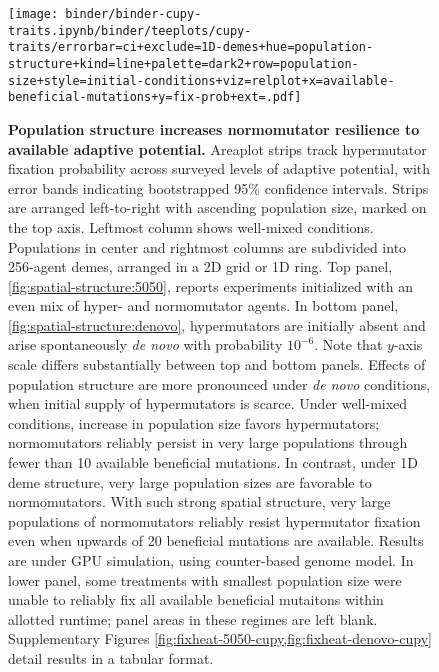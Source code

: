 \begin{figure}[h]
\begin{minipage}{\textwidth}
  \texttt{[image: binder/binder-cupy-traits.ipynb/binder/teeplots/cupy-traits/errorbar=ci+exclude=1D-demes+hue=population-structure+kind=line+palette=dark2+row=population-size+style=initial-conditions+viz=relplot+x=available-beneficial-mutations+y=fix-prob+ext=.pdf]}%
\end{minipage}

\begin{minipage}{\textwidth}
  \caption{%
    \textbf{Population structure increases normomutator resilience to available adaptive potential.}
    \footnotesize
    Areaplot strips track hypermutator fixation probability across surveyed levels of adaptive potential, with error bands indicating bootstrapped 95\% confidence intervals.
    Strips are arranged left-to-right with ascending population size, marked on the top axis.
    Leftmost column shows well-mixed conditions.
    Populations in center and rightmost columns are subdivided into 256-agent demes, arranged in a 2D grid or 1D ring.
    Top panel, \ref{fig:spatial-structure:5050}, reports experiments initialized with an even mix of hyper- and normomutator agents.
    In bottom panel, \ref{fig:spatial-structure:denovo}, hypermutators are initially absent and arise spontaneously \textit{de novo} with probability $10^{-6}$.
    Note that $y$-axis scale differs substantially between top and bottom panels.
    Effects of population structure are more pronounced under \textit{de novo} conditions, when initial supply of hypermutators is scarce.
    Under well-mixed conditions, increase in population size favors hypermutators; normomutators reliably persist in very large populations through fewer than 10 available beneficial mutations.
    In contrast, under 1D deme structure, very large population sizes are favorable to normomutators.
    With such strong spatial structure, very large populations of normomutators reliably resist hypermutator fixation even when upwards of 20 beneficial mutations are available.
    Results are under GPU simulation, using counter-based genome model.
    In lower panel, some treatments with smallest population size were unable to reliably fix all available beneficial mutaitons within allotted runtime; panel areas in these regimes are left blank.
    Supplementary Figures \cref{fig:fixheat-5050-cupy,fig:fixheat-denovo-cupy} detail results in a tabular format.
  }
  \label{fig:spatial-structure-combined}
\end{minipage}
\end{figure}
